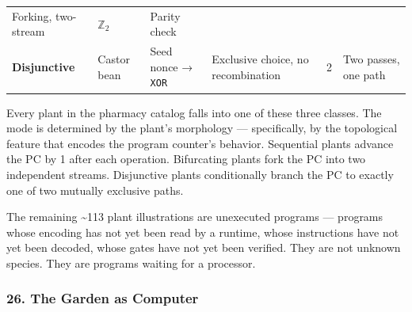\documentclass[12pt,a4paper]{article}
\begin{document}
\begin{longtable}[]{@{}llllll@{}}
\begin{minipage}[t]{0.16\columnwidth}
Forking, two-stream\strut
\end{minipage} & \begin{minipage}[t]{0.16\columnwidth}\raggedright
\(\mathbb{Z}_2\)\strut
\end{minipage} & \begin{minipage}[t]{0.13\columnwidth}\raggedright
Parity check\strut
\end{minipage}\tabularnewline
\begin{minipage}[t]{0.09\columnwidth}\raggedright
\textbf{Disjunctive}\strut
\end{minipage} & \begin{minipage}[t]{0.14\columnwidth}\raggedright
Castor bean\strut
\end{minipage} & \begin{minipage}[t]{0.16\columnwidth}\raggedright
Seed nonce → \texttt{XOR}\strut
\end{minipage} & \begin{minipage}[t]{0.16\columnwidth}\raggedright
Exclusive choice, no recombination\strut
\end{minipage} & \begin{minipage}[t]{0.16\columnwidth}\raggedright
2\strut
\end{minipage} & \begin{minipage}[t]{0.13\columnwidth}\raggedright
Two passes, one path\strut
\end{minipage}\tabularnewline
\bottomrule
\end{longtable}

Every plant in the pharmacy catalog falls into one of these three
classes. The mode is determined by the plant's morphology ---
specifically, by the topological feature that encodes the program
counter's behavior. Sequential plants advance the PC by 1 after each
operation. Bifurcating plants fork the PC into two independent streams.
Disjunctive plants conditionally branch the PC to exactly one of two
mutually exclusive paths.

The remaining \textasciitilde113 plant illustrations are unexecuted
programs --- programs whose encoding has not yet been read by a runtime,
whose instructions have not yet been decoded, whose gates have not yet
been verified. They are not unknown species. They are programs waiting
for a processor.

\hypertarget{the-garden-as-computer}{%
\subsubsection{26. The Garden as
Computer}\label{the-garden-as-computer}}
\end{document}
